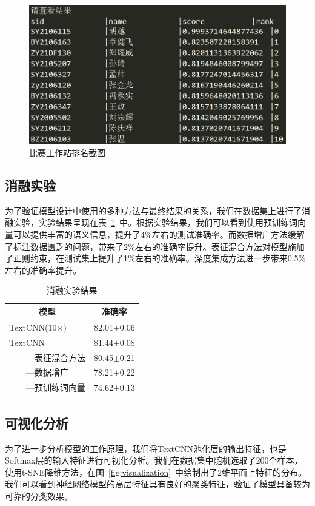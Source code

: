 \begin{figure}[htbp]
    \centering
    \includegraphics[width=.6\textwidth]{figs/rank.png}
    \caption{比赛工作站排名截图}
    \label{fig:rank}
\end{figure}


\subsection{消融实验}

为了验证模型设计中使用的多种方法与最终结果的关系，我们在数据集上进行了消融实验，实验结果呈现在表~\ref{tab:ablation}~中。根据实验结果，我们可以看到使用预训练词向量可以提供丰富的语义信息，提升了4\%左右的测试准确率。而数据增广方法缓解了标注数据匮乏的问题，带来了2\%左右的准确率提升。表征混合方法对模型施加了正则约束，在测试集上提升了1\%左右的准确率。深度集成方法进一步带来0.5\%左右的准确率提升。

\begin{table}[htbp]
    \centering
    \begin{tabular}{lc}
        \toprule
        \multicolumn{1}{c}{模型} & 准确率 \\
        \midrule
        TextCNN(10$\times$) & 82.01$\pm$0.06 \\
        TextCNN & 81.44$\pm$0.08 \\
        $\qquad$---表征混合方法 & 80.45$\pm$0.21 \\
        $\qquad$---数据增广 & 78.21$\pm$0.22 \\
        $\qquad$---预训练词向量 & 74.62$\pm$0.13 \\
        \bottomrule
    \end{tabular}
    \caption{消融实验结果}
    \label{tab:ablation}
\end{table}

\subsection{可视化分析}

为了进一步分析模型的工作原理，我们将TextCNN池化层的输出特征，也是Softmax层的输入特征进行可视化分析。我们在数据集中随机选取了200个样本，使用t-SNE\cite{van2008visualizing}降维方法，在图~\ref{fig:visualization}~中绘制出了2维平面上特征的分布。我们可以看到神经网络模型的高层特征具有良好的聚类特征，验证了模型具备较为可靠的分类效果。

